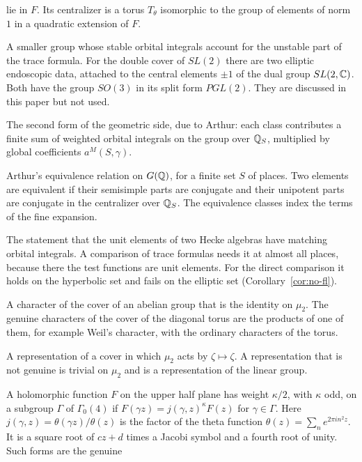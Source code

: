 \begin{description}
  lie in $F$. Its centralizer is a torus $T_\theta$ isomorphic to the
  group of elements of norm $1$ in a quadratic extension of $F$.
\item[Endoscopic group.] A smaller group whose stable orbital integrals
  account for the unstable part of the trace formula. For the double
  cover of $SL(2)$ there are two elliptic endoscopic data, attached to
  the central elements $\pm1$ of the dual group $SL(2,\mathbb{C})$. Both have the
  group $SO(3)$ in its split form $PGL(2)$. They are discussed in this
  paper but not used.
\item[Fine expansion.] The second form of the geometric side, due to
  Arthur: each class contributes a finite sum of weighted orbital
  integrals on the group over $\mathbb{Q}_S$, multiplied by global coefficients
  $a^M(S,\gamma)$.
\item[$(G,S)$-equivalence.] Arthur's equivalence relation on $G(\mathbb{Q})$, for
  a finite set $S$ of places. Two elements are equivalent if their
  semisimple parts are conjugate and their unipotent parts are conjugate
  in the centralizer over $\mathbb{Q}_S$. The equivalence classes index the terms
  of the fine expansion.
\item[Fundamental lemma.] The statement that the unit elements of two
  Hecke algebras have matching orbital integrals. A comparison of trace
  formulas needs it at almost all places, because there the test
  functions are unit elements. For the direct comparison it holds on the
  hyperbolic set and fails on the elliptic set
  (Corollary~\ref{cor:no-fl}).
\item[Genuine character.] A character of the cover of an abelian group
  that is the identity on $\mu_2$. The genuine characters of the cover of
  the diagonal torus are the products of one of them, for example Weil's
  character, with the ordinary characters of the torus.
\item[Genuine representation.] A representation of a cover in which
  $\mu_2$ acts by $\zeta\mapsto\zeta$. A representation that is not
  genuine is trivial on $\mu_2$ and is a representation of the linear
  group.
\item[Half-integral weight (in the sense of Shimura).] A holomorphic
  function $F$ on the upper half plane has weight $\kappa/2$, with
  $\kappa$ odd, on a subgroup $\Gamma$ of $\Gamma_0(4)$ if $F(\gamma z)=
  j(\gamma,z)^\kappa F(z)$ for $\gamma\in\Gamma$. Here $j(\gamma,z)=
  \theta(\gamma z)/\theta(z)$ is the factor of the theta function
  $\theta(z)=\sum_ne^{2\pi in^2z}$. It is a square root of $cz+d$ times a
  Jacobi symbol and a fourth root of unity. Such forms are the genuine

\end{description}
